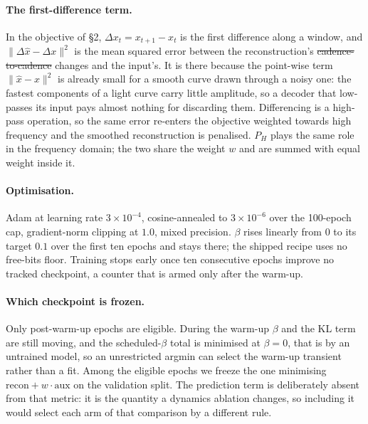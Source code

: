 \documentclass{article}
\makeatletter
\providecommand{\DIFaddtex}[1]{{\protect\color{blue}\uwave{#1}}} %
\providecommand{\DIFdeltex}[1]{{\protect\color{red}\sout{#1}}} %
\providecommand{\DIFaddbegin}{} %
\providecommand{\DIFaddend}{} %
\providecommand{\DIFdelbegin}{} %
\providecommand{\DIFdelend}{} %
\providecommand{\DIFadd}[1]{\texorpdfstring{\DIFaddtex{#1}}{#1}} %
\providecommand{\DIFdel}[1]{\texorpdfstring{\DIFdeltex{#1}}{}} %
\providecommand{\DIFscaledelfig}{0.5}
\newlength{\DIFdelgraphicswidth} %
\newlength{\DIFdelgraphicsheight} %
\providecommand{\DIFaddincludegraphics}[2][]{{\color{blue}\fbox{\DIFOincludegraphics[#1]{#2}}}} %
\providecommand{\DIFdelincludegraphics}[2][]{%
\sbox{\DIFdelgraphicsbox}{\DIFOincludegraphics[#1]{#2}}%
\settoboxwidth{\DIFdelgraphicswidth}{\DIFdelgraphicsbox} %
\settoboxtotalheight{\DIFdelgraphicsheight}{\DIFdelgraphicsbox} %
\scalebox{\DIFscaledelfig}{%
\parbox[b]{\DIFdelgraphicswidth}{\usebox{\DIFdelgraphicsbox}\\[-\baselineskip] \rule{\DIFdelgraphicswidth}{0em}}\llap{\resizebox{\DIFdelgraphicswidth}{\DIFdelgraphicsheight}{%
\setlength{\unitlength}{\DIFdelgraphicswidth}%
\begin{picture}(1,1)%
\thicklines\linethickness{2pt} %
{\color[rgb]{1,0,0}\put(0,0){\framebox(1,1){}}}%
{\color[rgb]{1,0,0}\put(0,0){\line( 1,1){1}}}%
{\color[rgb]{1,0,0}\put(0,1){\line(1,-1){1}}}%
\end{picture}%
}\hspace*{3pt}}} %
} %
\DeclareRobustCommand{\DIFaddbegin}{\DIFOaddbegin \let\includegraphics\DIFaddincludegraphics} %
\DeclareRobustCommand{\DIFaddend}{\DIFOaddend \let\includegraphics\DIFOincludegraphics} %
\DeclareRobustCommand{\DIFdelbegin}{\DIFOdelbegin \let\includegraphics\DIFdelincludegraphics} %
\DeclareRobustCommand{\DIFdelend}{\DIFOaddend \let\includegraphics\DIFOincludegraphics} %
\let\sout@orig\sout %
\renewcommand{\sout}[1]{\ifmmode\text{\sout@orig{\ensuremath{#1}}}\else\sout@orig{#1}\fi} %
\makeatother
\begin{document}
\paragraph{The first-difference term.} In the objective of \S2, $\Delta x_{t} = x_{t+1} - x_{t}$ is
the first difference along a window, and $\|\Delta\hat{x}-\Delta x\|^{2}$ is the mean squared error
between the reconstruction's \DIFdelbegin \DIFdel{cadence-to-cadence }\DIFdelend \DIFaddbegin \DIFadd{point-to-point }\DIFaddend changes and the input's. It is there because the
point-wise term $\|\hat{x}-x\|^{2}$ is already small for a smooth curve drawn through a noisy one:
the fastest components of a light curve carry little amplitude, so a decoder that low-passes its
input pays almost nothing for discarding them. Differencing is a high-pass operation, so the same
error re-enters the objective weighted towards high frequency and the smoothed reconstruction is
penalised. $P_{H}$ plays the same role in the frequency domain; the two share the weight $w$ and are
summed with equal weight inside it.

\paragraph{Optimisation.} Adam at learning rate $3\times10^{-4}$, cosine-annealed to
$3\times10^{-6}$ over the 100-epoch cap, gradient-norm clipping at $1.0$, mixed precision. $\beta$
rises linearly from $0$ to its target $0.1$ over the first ten epochs and stays there; the shipped
recipe uses no free-bits floor. Training stops early once ten consecutive epochs improve no tracked
checkpoint, a counter that is armed only after the warm-up.

\paragraph{Which checkpoint is frozen.} Only post-warm-up epochs are eligible. During the warm-up
$\beta$ and the KL term are still moving, and the scheduled-$\beta$ total is minimised at $\beta=0$,
that is by an untrained model, so an unrestricted argmin can select the warm-up transient rather than
a fit. Among the eligible epochs we freeze the one minimising
$\mathrm{recon} + w\cdot\mathrm{aux}$ on the validation split. The prediction term is deliberately
absent from that metric: it is the quantity a dynamics ablation changes, so including it would select
each arm of that comparison by a different rule.
\end{document}
